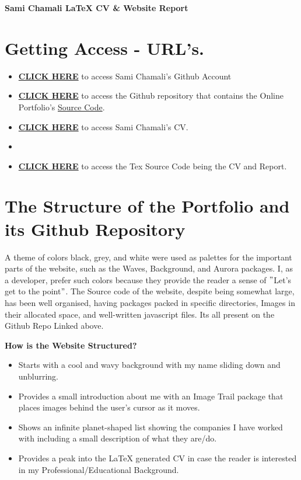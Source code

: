 \documentclass[12pt, letterpaper]{article}
\begin{document}
    \begin{center}
        \textbf{Sami Chamali LaTeX CV \& Website Report}


    \end{center}
    \section{Getting Access - URL's.}
    \begin{itemize}
        \item \textbf{\href{https://github.com/samichamali}{CLICK HERE}} to access Sami Chamali's Github Account
        \item \textbf{\href{https://github.com/samichamali/portfolio}{CLICK HERE}} to access the Github repository that contains the Online Portfolio's \underline{Source Code}.
        \item \textbf{\href{https://samichamali.github.io/portfolio/Images/CV.pdf}{CLICK HERE}} to access Sami Chamali's CV.
        \item \item \textbf{\href{https://github.com/samichamali/portfolio/tree/main/CV%20and%20Report%20Tex%20Files}{CLICK HERE}} to access the Tex Source Code being the CV and Report.
    \end{itemize}

    \section{The Structure of the Portfolio and its Github Repository}
    A theme of colors black, grey, and white were used as palettes for the important parts of the website, such as the Waves, Background, and Aurora packages. I, as a developer, prefer such colors because they provide the reader a sense of \("\)Let's get to the point\("\).
    The Source code of the website, despite being somewhat large, has been well organised, having packages packed in specific directories, Images in their allocated space, and well-written javascript files. Its all present on the Github Repo Linked above.
    \par \textbf{How is the Website Structured?}
    \begin{itemize}
        \item Starts with a cool and wavy background with my name sliding down and unblurring.
        \item Provides a small introduction about me with an Image Trail package that places images behind the user's cursor as it moves.
        \item Shows an infinite planet-shaped list showing the companies I have worked with including a small description of what they are/do.
        \item Provides a peak into the LaTeX generated CV in case the reader is interested in my Professional/Educational Background.
    \end{itemize}
\end{document}

